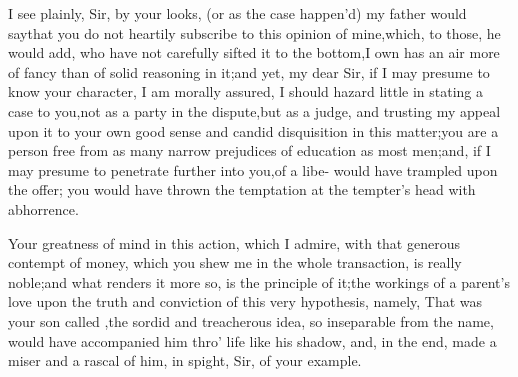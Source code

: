 \documentclass{article}
\begin{document}
I see plainly, Sir, by your looks, (or as the case happen’d) my
father would say\tsk that you do not heartily subscribe to this
opinion of mine,\tsk which, to those, he would add, who have not
carefully sifted it to the bottom,\tsk I own has an air more of
fancy than of solid reasoning in it;\tsh and yet, my dear
Sir, if I may presume to know your character, I am morally assured,
I should hazard little in stating a case to you,\tsk not as a party in
the dispute,\tsk but as a judge, and trusting my appeal upon it
to your own good sense and candid disquisition in this
matter;\tsh you are a person free from as many narrow
prejudices of education as most men;\tsk and, if I may presume to
penetrate further into you,\tsk of a libe- 
would have trampled upon the offer;\tsk{} you
would have thrown the temptation at the tempter’s head with
abhorrence.

Your greatness of mind in this action, which I admire, with that
generous contempt of money, which you shew me in the whole
transaction, is really noble;\tsk\break and what renders it more so, is
the principle of it;\tsk the workings of a parent’s\break
love upon the truth and conviction of\break
this very hypothesis, namely, That
was your son called ,\tsk the sordid and
treacherous idea, so inseparable from the name, would have
accompanied him\break
thro’ life like his shadow, and, in the\break
end, made a miser and a rascal of him,\break 
in spight, Sir, of your example.
\end{document}
